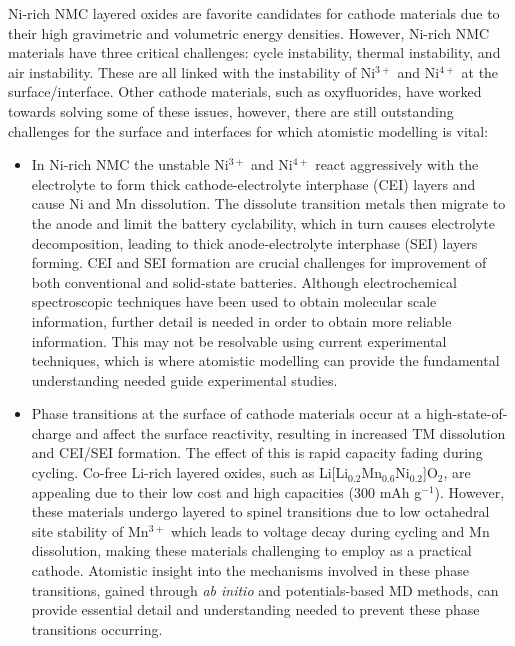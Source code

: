 \documentclass[../main.tex]{subfiles}
\begin{document}
Ni-rich NMC layered oxides are favorite candidates for cathode materials due to their high gravimetric and volumetric energy densities.\cite{li2020high} However, Ni-rich NMC materials have three critical challenges: cycle instability, thermal instability, and air instability. These are all linked with the instability of Ni$^{3+}$ and Ni$^{4+}$ at the surface/interface. Other cathode materials, such as oxyfluorides, have worked towards solving some of these issues, however, there are still outstanding challenges for the surface and interfaces for which atomistic modelling is vital:
\begin{itemize}
    \item In Ni-rich NMC the unstable Ni$^{3+}$ and Ni$^{4+}$ react aggressively with the electrolyte to form thick cathode-electrolyte interphase (CEI) layers and cause Ni and Mn dissolution. The dissolute transition metals then migrate to the anode and limit the battery cyclability, \cite{li2017dynamic,li2018mn} which in turn causes electrolyte decomposition, leading to thick anode-electrolyte interphase (SEI) layers forming. CEI and SEI formation are crucial challenges for improvement of both conventional and solid-state batteries. Although electrochemical spectroscopic techniques have been used to obtain molecular scale information, further detail is needed in order to obtain more reliable information. This may not be resolvable using current experimental techniques, which is where atomistic modelling can provide the fundamental understanding needed guide experimental studies.
    \item Phase transitions at the surface of cathode materials occur at a high-state-of-charge and affect the surface reactivity, resulting in increased TM dissolution and CEI/SEI formation. The effect of this is rapid capacity fading during cycling. \cite{li2019comprehensive} Co-free Li-rich layered oxides, such as Li[Li$_{0.2}$Mn$_{0.6}$Ni$_{0.2}$]O$_{2}$, are appealing due to their low cost and high capacities (300 mAh g$^{-1}$). \cite{kim2004electrochemical,armstrong2006demonstrating} However, these materials undergo layered to spinel transitions due to low octahedral site stability of Mn$^{3+}$ which leads to voltage decay during cycling and Mn dissolution,\cite{MnDissolution2016} making these materials challenging to employ as a practical cathode. Atomistic insight into the mechanisms involved in these phase transitions, gained through \textit{ab initio} and potentials-based MD methods, can provide essential detail and understanding needed to prevent these phase transitions occurring.

\end{itemize}
\end{document}
